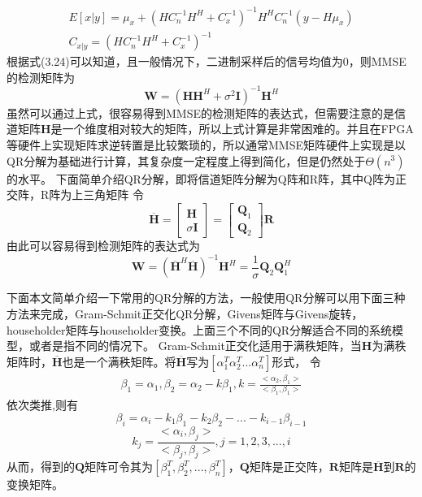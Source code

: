 \documentclass[bachelor,nocolorlinks, printoneside]{seuthesis} %
\begin{document}
\begin{Main}
\begin{eqnarray}\label{key}
E[x|y] = \mu_{x} + (HC_n^{-1}H^H + C_x^{-1})^{-1}H^H C_n^{-1}(y-H\mu_{x}) \\ 
C_{x|y} = (H C_n^{-1} H^H + C_x^{-1})^{-1}
\end{eqnarray}
根据式(3.24)可以知道，且一般情况下，二进制采样后的信号均值为0，则MMSE的检测矩阵为
\begin{equation}\label{key}
\mathbf{W} = (\mathbf{H}\mathbf{H}^H + \sigma^2 \mathbf{I})^{-1}\mathbf{H}^H
\end{equation}
虽然可以通过上式，很容易得到MMSE的检测矩阵的表达式，但需要注意的是信道矩阵$\mathbf{H}$是一个维度相对较大的矩阵，所以上式计算是非常困难的。并且在FPGA等硬件上实现矩阵求逆转置是比较繁琐的，所以通常MMSE矩阵硬件上实现是以QR分解为基础进行计算，其复杂度一定程度上得到简化，但是仍然处于$\Theta(n^3)$的水平。
下面简单介绍QR分解，即将信道矩阵分解为Q阵和R阵，其中Q阵为正交阵，R阵为上三角矩阵
令
\begin{equation}\label{key}
\overline{\mathbf{H}} = \left[
\begin{array}{c}
\mathbf{H}\\
\sigma \mathbf{I}
\end{array} \right] =
\left[
\begin{array}{c}
\mathbf{Q}_1\\
\mathbf{Q}_2
\end{array} \right] \mathbf{R}
\end{equation}
由此可以容易得到检测矩阵的表达式为
\begin{equation}\label{key}
\mathbf{W}=(\overline{\mathbf{H}}^H \overline{\mathbf{H}})^{-1} \mathbf{H}^H = \frac{1}{\sigma} \mathbf{Q}_2 \mathbf{Q}_1^H
\end{equation}

下面本文简单介绍一下常用的QR分解的方法，一般使用QR分解可以用下面三种方法来完成，Gram-Schmit正交化QR分解，Givens矩阵与Givens旋转，householder矩阵与householder变换。上面三个不同的QR分解适合不同的系统模型，或者是指不同的情况下。
Gram-Schmit正交化适用于满秩矩阵，当$\mathbf{H}$为满秩矩阵时，$\overline{\mathbf{H}}$也是一个满秩矩阵。将$\overline{\mathbf{H}}$写为$[\alpha_1^T \alpha_2^T ... \alpha_n^T]$形式，
令
\begin{eqnarray}\label{key}
\beta_1 = \alpha_1 , \beta_2 = \alpha_2 - k\beta_1 , k = \frac{<\alpha_2,\beta_1>}{<\beta_1,\beta_1>} \nonumber
\end{eqnarray}
依次类推,则有
\begin{equation}\label{key}
\beta_i = \alpha_i - k_1\beta_1 -k_2\beta_2 - ... - k_{i-1}\beta_{i-1} \nonumber
\end{equation}
\begin{equation}\label{key}
k_j = \frac{<\alpha_i,\beta_j>}{<\beta_j,\beta_j>}, j= 1,2,3,...,i \nonumber
\end{equation}
从而，得到的$\mathbf{Q}$矩阵可令其为$[\beta_1^T,\beta_2^T,...,\beta_n^T]$，$\mathbf{Q}$矩阵是正交阵，$\mathbf{R}$矩阵是$\overline{\mathbf{H}}$到$\mathbf{R}$的变换矩阵。


\end{Main}
\end{document}
